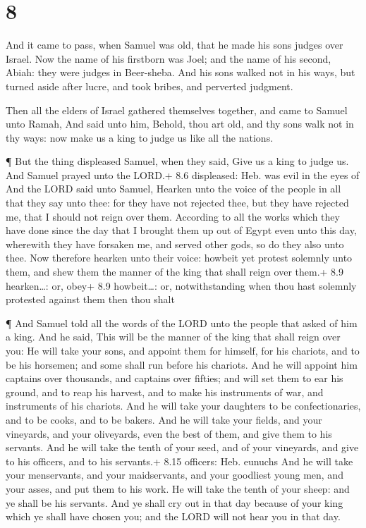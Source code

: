 \hypertarget{section-7}{%
\section{8}\label{section-7}}

 And it came to pass, when Samuel was old, that he made his
sons judges over Israel.  Now the name of his firstborn was
Joel; and the name of his second, Abiah: they were judges in Beer-sheba.
 And his sons walked not in his ways, but turned aside after
lucre, and took bribes, and perverted judgment.

 Then all the elders of Israel gathered themselves together,
and came to Samuel unto Ramah,  And said unto him, Behold,
thou art old, and thy sons walk not in thy ways: now make us a king to
judge us like all the nations.

 ¶ But the thing displeased Samuel, when they said, Give us
a king to judge us. And Samuel prayed unto the LORD.+ 8.6 displeased:
Heb. was evil in the eyes of  And the LORD said unto Samuel,
Hearken unto the voice of the people in all that they say unto thee: for
they have not rejected thee, but they have rejected me, that I should
not reign over them.  According to all the works which they
have done since the day that I brought them up out of Egypt even unto
this day, wherewith they have forsaken me, and served other gods, so do
they also unto thee.  Now therefore hearken unto their
voice: howbeit yet protest solemnly unto them, and shew them the manner
of the king that shall reign over them.+ 8.9 hearken\ldots: or, obey+
8.9 howbeit\ldots: or, notwithstanding when thou hast solemnly protested
against them then thou shalt

 ¶ And Samuel told all the words of the LORD unto the
people that asked of him a king.  And he said, This will be
the manner of the king that shall reign over you: He will take your
sons, and appoint them for himself, for his chariots, and to be his
horsemen; and some shall run before his chariots.  And he
will appoint him captains over thousands, and captains over fifties; and
will set them to ear his ground, and to reap his harvest, and to make
his instruments of war, and instruments of his chariots. 
And he will take your daughters to be confectionaries, and to be cooks,
and to be bakers.  And he will take your fields, and your
vineyards, and your oliveyards, even the best of them, and give them to
his servants.  And he will take the tenth of your seed, and
of your vineyards, and give to his officers, and to his servants.+ 8.15
officers: Heb. eunuchs  And he will take your menservants,
and your maidservants, and your goodliest young men, and your asses, and
put them to his work.  He will take the tenth of your
sheep: and ye shall be his servants.  And ye shall cry out
in that day because of your king which ye shall have chosen you; and the
LORD will not hear you in that day.

